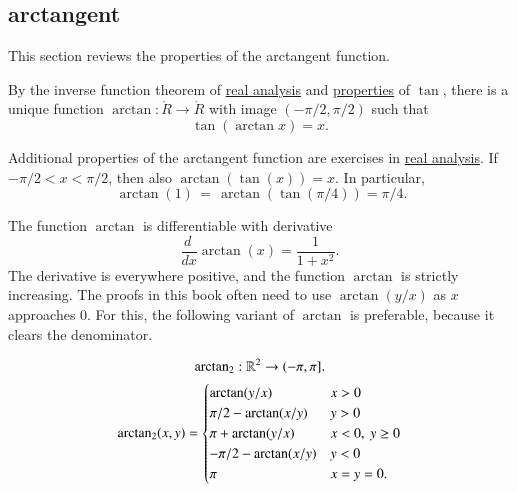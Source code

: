 \subsection{arctangent}

This section reviews the properties of the arctangent function.  

\begin{definition}[arctangent]\label{def:arctan}
  By the inverse function theorem of \hyperref[back:analysis]{real
    analysis} and \hyperref[lemma:tan-monotone]{properties} of $\tan$,
  there is a unique function $\arctan:\ring{R}\to\ring{R}$ with image
  $(-\pi/2,\pi/2)$ such that
\begin{equation}\label{eqn:tanarctan}\tan(\arctan x) =x.\end{equation}
%
\end{definition}

Additional properties of the arctangent function are exercises in
\hyperref[back:analysis]{real analysis}.  If $-\pi/2 < x < \pi/2$,
then also $\arctan(\tan(x)) = x$. In particular,
\begin{equation}\label{eqn:arctan-1}\
\arctan(1) \hyperref[lemma:tan-pi4]{\,=\,} \arctan(\tan(\pi/4)) = \pi/4.
\end{equation}


The function $\arctan$ is differentiable with derivative%
\begin{equation}\label{eqn:deriv-tan}\frac{d\phantom{~}} {dx} \arctan(x) = \frac{1}{1 +
    x^2}.\end{equation}
The derivative is everywhere positive, and the function $\arctan$ is
strictly increasing.
%
The proofs in this book often need to use $\arctan(y/x)$ as  $x$ approaches $0$.
For this, the following variant of $\arctan$ is preferable, because it clears the denominator.


\begin{definition}[$\atn$]\label{def:atn}
\begin{displaymath}
{\operatorname{arctan\ensuremath{_2}}}: \mathbb{R}^2 \to (-\pi,\pi].
\end{displaymath}
\begin{displaymath}
{\operatorname{arctan\ensuremath{_2}}}(x,y) = \begin{cases}
\arctan(y/x) & x > 0\\
\pi/2- \arctan(x/y) & y > 0 \\
\pi + \arctan(y/x) & x< 0,\  y\ge 0\\
-\pi/2- \arctan(x/y) & y< 0 \\
\pi & x= y=0.\\
\end{cases}
\end{displaymath}
\end{definition}
%
%


